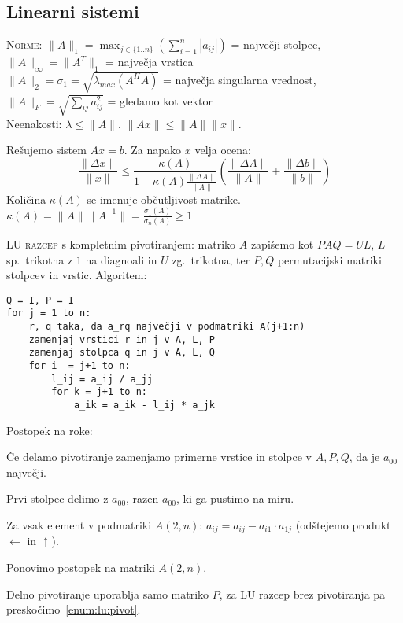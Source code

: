 \documentclass[a4paper,10pt]{article}
\theoremstyle{definition}
\newenvironment{enumerate*}%
{
\vspace{-6pt}
\begin{enumerate}
\setlength{\itemsep}{0pt}
\setlength{\parskip}{2pt}
}
{\end{enumerate}}
\begin{document}
\subsection*{Linearni sistemi}

\textsc{Norme:} $\|A\|_1 =
\max_{j\in\{1..n\}}\left(\sum_{i=1}^n|a_{ij}|\right)$ = največji stolpec,
$\|A\|_\infty = \|A^T\|_1$ = največja vrstica \\
$\|A\|_2 = \sigma_1 = \sqrt{\lambda_{max}(A^HA)}$ = največja singularna vrednost,
$\|A\|_F = \sqrt{\sum_{ij}a_{ij}^2}$ = gledamo kot vektor \\
Neenakosti: $\lambda \leq \|A\|$. $\|Ax\| \leq \|A\|\|x\|$.

Rešujemo sistem $Ax=b$. Za napako $x$ velja ocena:
\[ \frac{\|\Delta x\|}{\|x\|}  \leq \frac{\kappa(A)}{1-\kappa(A) \frac{\|\Delta
A\|}{\|A\|}} \left( \frac{\|\Delta A\|}{\|A\|} + \frac{\|\Delta
b\|}{\|b\|}\right) \]
Količina $\kappa(A)$ se imenuje občutljivost matrike. $\kappa(A) =
\|A\|\|A^{-1}\| = \frac{\sigma_1(A)}{\sigma_n(A)} \geq 1$

\textsc{LU razcep} s kompletnim pivotiranjem: matriko $A$ zapišemo kot $PAQ =
UL$, $L$ sp.\ trikotna z $1$ na diagnoali in $U$ zg.\ trikotna, ter $P, Q$
permutacijski matriki stolpcev in vrstic. Algoritem:
\begin{verbatim}
Q = I, P = I
for j = 1 to n:
    r, q taka, da a_rq največji v podmatriki A(j+1:n)
    zamenjaj vrstici r in j v A, L, P
    zamenjaj stolpca q in j v A, L, Q
    for i  = j+1 to n:
        l_ij = a_ij / a_jj
        for k = j+1 to n:
            a_ik = a_ik - l_ij * a_jk
\end{verbatim}

Postopek na roke:
\begin{enumerate*}
  \item * Če delamo pivotiranje zamenjamo primerne vrstice in stolpce v
    $A, P, Q$, da je $a_{00}$ največji. \label{enum:lu:pivot}
  \item Prvi stolpec delimo z $a_{00}$, razen $a_{00}$, ki ga pustimo na miru.
  \item Za vsak element v podmatriki $A(2, n)$: $a_{ij} = a_{ij} - a_{i1} \cdot
    a_{1j}$ (odštejemo produkt  $\leftarrow$ in $\uparrow$).
  \item Ponovimo postopek na matriki $A(2, n)$.
\end{enumerate*}

Delno pivotiranje uporablja samo matriko $P$, za LU razcep brez pivotiranja pa
preskočimo~\ref{enum:lu:pivot}.
\end{document}
